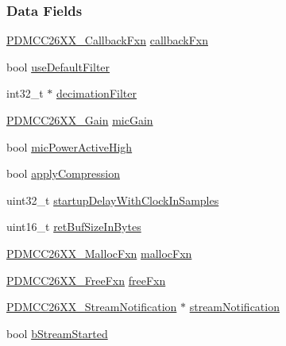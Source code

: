 \subsubsection*{Data Fields}
\begin{DoxyCompactItemize}
\item 
\hyperlink{_p_d_m_c_c26_x_x_8h_ab6fdee59a79029e938e3fbf0e446fa91}{P\+D\+M\+C\+C26\+X\+X\+\_\+\+Callback\+Fxn} \hyperlink{struct_p_d_m_c_c26_x_x___object_a9506c80c0b58cf030d46721d90d96bb7}{callback\+Fxn}
\item 
bool \hyperlink{struct_p_d_m_c_c26_x_x___object_aa58da7962e125606a13d81974f6583af}{use\+Default\+Filter}
\item 
int32\+\_\+t $\ast$ \hyperlink{struct_p_d_m_c_c26_x_x___object_a5ad6bc8c2f84662d4536b519369de8c3}{decimation\+Filter}
\item 
\hyperlink{_p_d_m_c_c26_x_x_8h_a8c2d67aee547a2c8228465034ae0267f}{P\+D\+M\+C\+C26\+X\+X\+\_\+\+Gain} \hyperlink{struct_p_d_m_c_c26_x_x___object_ada0adccda34612164f184b9de0e77dd0}{mic\+Gain}
\item 
bool \hyperlink{struct_p_d_m_c_c26_x_x___object_a9fa96e50147f141ed92b212e20b6b8dc}{mic\+Power\+Active\+High}
\item 
bool \hyperlink{struct_p_d_m_c_c26_x_x___object_a8e2020efb94b94f43615aea729bda8dc}{apply\+Compression}
\item 
uint32\+\_\+t \hyperlink{struct_p_d_m_c_c26_x_x___object_af20066ae39625d19c95159696bd720d0}{startup\+Delay\+With\+Clock\+In\+Samples}
\item 
uint16\+\_\+t \hyperlink{struct_p_d_m_c_c26_x_x___object_a05f92e36498598102830fa57a91c2a85}{ret\+Buf\+Size\+In\+Bytes}
\item 
\hyperlink{_p_d_m_c_c26_x_x_8h_acce02978ce536ea3b98a673587a6e75c}{P\+D\+M\+C\+C26\+X\+X\+\_\+\+Malloc\+Fxn} \hyperlink{struct_p_d_m_c_c26_x_x___object_a4805a0277b49cce6fa2c4255cb4e26a4}{malloc\+Fxn}
\item 
\hyperlink{_p_d_m_c_c26_x_x_8h_af95e29fbea1fadfb011e4ceaa36f1ab0}{P\+D\+M\+C\+C26\+X\+X\+\_\+\+Free\+Fxn} \hyperlink{struct_p_d_m_c_c26_x_x___object_a1c7fe813d98d451be08b4d7f7618f2f3}{free\+Fxn}
\item 
\hyperlink{struct_p_d_m_c_c26_x_x___stream_notification}{P\+D\+M\+C\+C26\+X\+X\+\_\+\+Stream\+Notification} $\ast$ \hyperlink{struct_p_d_m_c_c26_x_x___object_a16a58b87745354f508e1c58751ad03a4}{stream\+Notification}
\item 
bool \hyperlink{struct_p_d_m_c_c26_x_x___object_adfc3804a23ec7edc2c113d433006c697}{b\+Stream\+Started}

\end{DoxyCompactItemize}

